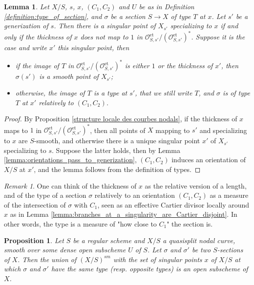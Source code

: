 \documentclass[a4paper,12pt]{amsart} %
\numberwithin{equation}{subsection}
\newcommand{\on}[1]{\operatorname{#1}}
\theoremstyle{definition}
\theoremstyle{plain}%
\newtheorem{proposition}[definition]{Proposition}
\newtheorem{lemma}[definition]{Lemma}
\theoremstyle{remark}
\newtheorem{remark}[definition]{Remark}
\renewcommand{\O}{\mathcal{O}}
\begin{document}
\begin{lemma}\label{lemma:type_passes_to_generization}
Let $X/S$, $s$, $x$, $(C_1,C_2)$ and $U$ be as in Definition \ref{definition:type_of_section}, and $\sigma$ be a section $S\to X$ of type $T$ at $x$. Let $s'$ be a generization of $s$. Then there is a singular point of $X_{s'}$ specializing to $x$ if and only if the thickness of $x$ does not map to $1$ in $\O_{S,s'}^{\on{et}}/(\O_{S,s'}^{\on{et}})^*$. Suppose it is the case and write $x'$ this singular point, then
\begin{itemize}
\item if the image of $T$ in $\O_{S,s'}^{\on{et}}/(\O_{S,s'}^{\on{et}})^*$ is either $1$ or the thickness of $x'$, then $\sigma(s')$ is a smooth point of $X_{s'}$;
\item otherwise, the image of $T$ is a type at $s'$, that we still write $T$, and $\sigma$ is of type $T$ at $x'$ relatively to $(C_1,C_2)$.
\end{itemize}
\end{lemma}

\begin{proof}
By Proposition \ref{structure locale des courbes nodals}, if the thickness of $x$ maps to $1$ in $\O_{S,s'}^{\on{et}}/(\O_{S,s'}^{\on{et}})^*$, then all points of $X$ mapping to $s'$ and specializing to $x$ are $S$-smooth, and otherwise there is a unique singular point $x'$ of $X_{s'}$ specializing to $s$. Suppose the latter holds, then by Lemma \ref{lemma:orientations_pass_to_generization}, $(C_1,C_2)$ induces an orientation of $X/S$ at $x'$, and the lemma follows from the definition of types.
\end{proof}

\begin{remark}
One can think of the thickness of $x$ as the relative version of a length, and of the type of a section $\sigma$ relatively to an orientation $(C_1,C_2)$ as a measure of the intersection of $\sigma$ with $C_1$, seen as an effective Cartier divisor locally around $x$ as in Lemma \ref{lemma:branches_at_a_singularity_are_Cartier_disjoint}. In other words, the type is a measure of "how close to $C_1$" the section is.
\end{remark}

\begin{proposition}\label{proposition:locus_of_same_type_is_open}
Let $S$ be a regular scheme and $X/S$ a quasisplit nodal curve, smooth over some dense open subscheme $U$ of $S$. Let $\sigma$ and $\sigma'$ be two $S$-sections of $X$. Then the union of $(X/S)^{sm}$ with the set of singular points $x$ of $X/S$ at which $\sigma$ and $\sigma'$ have the same type (resp. opposite types) is an open subscheme of $X$.
\end{proposition}
\end{document}
